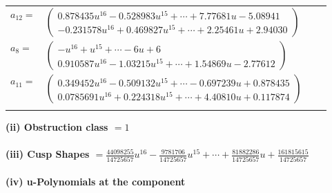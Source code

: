 \documentclass[1p]{elsarticle_modified}
\theoremstyle{definition}
\begin{document}
\begin{tabular}{m{7pt} m{180pt} m{7pt} m{180pt} }
\flushright $a_{12}=$&$\begin{pmatrix}0.878435 u^{16}-0.528983 u^{15}+\cdots+7.77681 u-5.08941\\-0.231578 u^{16}+0.469827 u^{15}+\cdots+2.25461 u+2.94030\end{pmatrix}$ \\
\flushright $a_{8}=$&$\begin{pmatrix}- u^{16}+u^{15}+\cdots-6 u+6\\0.910587 u^{16}-1.03215 u^{15}+\cdots+1.54869 u-2.77612\end{pmatrix}$ \\
\flushright $a_{11}=$&$\begin{pmatrix}0.349452 u^{16}-0.509132 u^{15}+\cdots-0.697239 u+0.878435\\0.0785691 u^{16}+0.224318 u^{15}+\cdots+4.40810 u+0.117874\end{pmatrix}$\\&\end{tabular}
\flushleft \textbf{(ii) Obstruction class $= 1$}\\~\\
\flushleft \textbf{(iii) Cusp Shapes $= \frac{44098255}{14725657} u^{16}-\frac{9781706}{14725657} u^{15}+\cdots+\frac{81882286}{14725657} u+\frac{161815615}{14725657}$}\\~\\
\newpage\renewcommand{\arraystretch}{1}
\flushleft \textbf{(iv) u-Polynomials at the component}\newline \\
\end{document}
